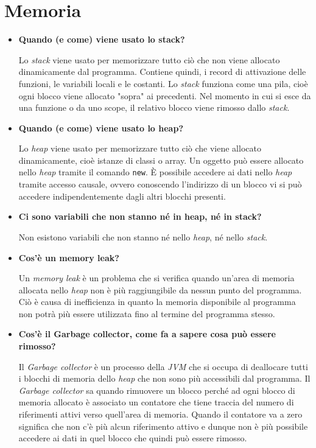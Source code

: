 \documentclass[12pt, a4paper]{article}
\begin{document}
\section{Memoria}
\begin{itemize}
    \item \textbf{Quando (e come) viene usato lo stack?}
    
    Lo \emph{stack} viene usato per memorizzare tutto ciò che non viene allocato
    dinamicamente dal programma. Contiene quindi, i record di attivazione delle
    funzioni, le variabili locali e le costanti. Lo \emph{stack} funziona come una
    pila, cioè ogni blocco viene allocato "sopra" ai precedenti. Nel momento in cui
    si esce da una funzione o da uno scope, il relativo blocco viene rimosso dallo
    \emph{stack}.
    \item \textbf{Quando (e come) viene usato lo heap?}
    
    Lo \emph{heap} viene usato per memorizzare tutto ciò che viene allocato dinamicamente,
    cioè istanze di classi o array. Un oggetto può essere allocato nello \emph{heap}
    tramite il comando \texttt{new}. È possibile accedere ai dati nello \emph{heap}
    tramite accesso causale, ovvero conoscendo l'indirizzo di un blocco vi si può
    accedere indipendentemente dagli altri blocchi presenti.
    \item \textbf{Ci sono variabili che non stanno né in heap, né in stack?}
    
    Non esistono variabili che non stanno né nello \emph{heap}, né nello \emph{stack}.
    \item \textbf{Cos'è un memory leak?}
    
    Un \emph{memory leak} è un problema che si verifica quando un'area di memoria
    allocata nello \emph{heap} non è più raggiungibile da nessun punto del programma.
    Ciò è causa di inefficienza in quanto la memoria disponibile al programma
    non potrà più essere utilizzata fino al termine del programma stesso.
    \item \textbf{Cos'è il Garbage collector, come fa a sapere cosa può essere rimosso?}
    
    Il \emph{Garbage collector} è un processo della \emph{JVM} che si occupa di
    deallocare tutti i blocchi di memoria dello \emph{heap} che non sono più
    accessibili dal programma. Il \emph{Garbage collector} sa quando rimuovere un
    blocco perché ad ogni blocco di memoria allocato è associato un contatore che
    tiene traccia del numero di riferimenti attivi verso quell'area di memoria.
    Quando il contatore va a zero significa che non c'è più alcun riferimento attivo
    e dunque non è più possibile accedere ai dati in quel blocco che quindi può
    essere rimosso.
\end{itemize}
\end{document}
